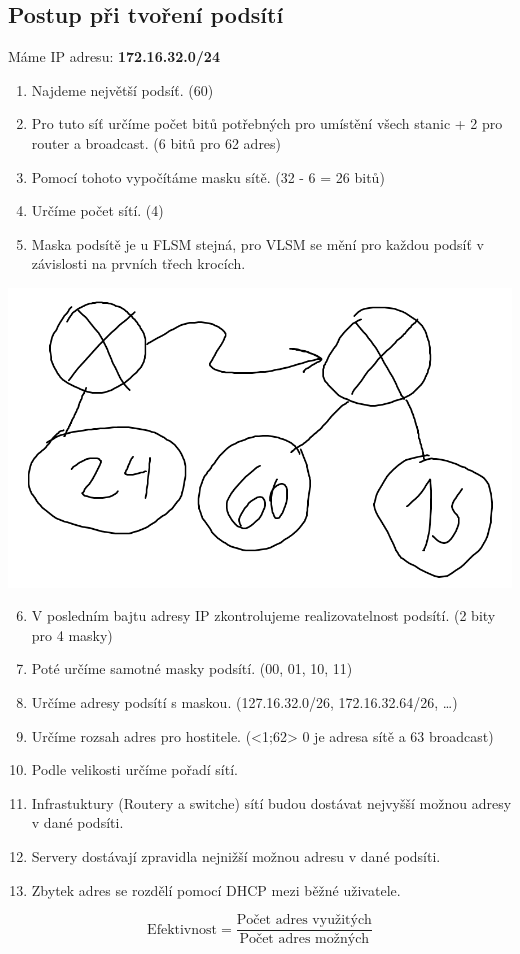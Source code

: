 \subsection{Postup při tvoření podsítí}
\begin{multicols}{2}
  \begin{center}
    Máme IP adresu: \textbf{172.16.32.0/24}
  \end{center}
  \begin{enumerate}
    \item Najdeme největší podsíť. (60)
    \item Pro tuto síť určíme počet bitů potřebných pro umístění všech stanic + 2 pro router a broadcast. (6 bitů pro 62 adres)
    \item Pomocí tohoto vypočítáme masku sítě. (32 - 6 = 26 bitů)
    \item Určíme počet sítí. (4)
    \item Maska podsítě je u FLSM stejná, pro VLSM se mění pro každou podsíť v závislosti na prvních třech krocích.
  \end{enumerate}
  \columnbreak
  \includegraphics[width=\linewidth]{TVY-POS/Podsite-IPv4/podsit.png}
\end{multicols}
\begin{enumerate}
  \setcounter{enumi}{5}
  \item V posledním bajtu adresy IP zkontrolujeme realizovatelnost podsítí. (2 bity pro 4 masky)
  \item Poté určíme samotné masky podsítí. (00, 01, 10, 11)
  \item Určíme adresy podsítí s maskou. (127.16.32.0/26, 172.16.32.64/26, \dots)
  \item Určíme rozsah adres pro hostitele. (<1;62> 0 je adresa sítě a 63 broadcast)
  \item Podle velikosti určíme pořadí sítí.
  \item Infrastuktury (Routery a switche) sítí budou dostávat nejvyšší možnou adresy v dané podsíti.
  \item Servery dostávají zpravidla nejnižší možnou adresu v dané podsíti.
  \item Zbytek adres se rozdělí pomocí DHCP mezi běžné uživatele.
\end{enumerate}

\[\text{Efektivnost} = \frac{\text{Počet adres využitých}}{\text{Počet adres možných}}\]
